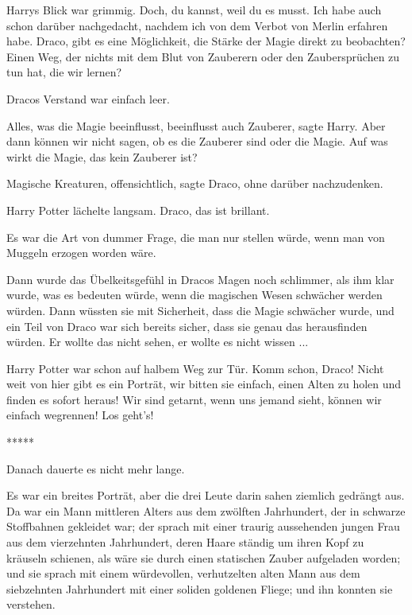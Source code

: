 Harrys Blick war grimmig. \glqq{}Doch, du kannst, weil du es musst. Ich habe
auch schon darüber nachgedacht, nachdem ich von dem Verbot von Merlin erfahren
habe. Draco, gibt es eine Möglichkeit, die Stärke der Magie direkt zu
beobachten? Einen Weg, der nichts mit dem Blut von Zauberern oder den
Zaubersprüchen zu tun hat, die wir lernen?\grqq{}

Dracos Verstand war einfach leer.

\glqq{}Alles, was die Magie beeinflusst, beeinflusst auch Zauberer\grqq{}, sagte
Harry. \glqq{}Aber dann können wir nicht sagen, ob es die Zauberer sind oder die
Magie. Auf was wirkt die Magie, das kein Zauberer ist?\grqq{}

\glqq{}Magische Kreaturen, offensichtlich\grqq{}, sagte Draco, ohne darüber
nachzudenken.

Harry Potter lächelte langsam. \glqq{}Draco, das ist brillant.\grqq{}

Es war die Art von dummer Frage, die man nur stellen würde, wenn man von Muggeln
erzogen worden wäre.

Dann wurde das Übelkeitsgefühl in Dracos Magen noch schlimmer, als ihm klar
wurde, was es bedeuten würde, wenn die magischen Wesen schwächer werden würden.
Dann wüssten sie mit Sicherheit, dass die Magie schwächer wurde, und ein Teil
von Draco war sich bereits sicher, dass sie genau das herausfinden würden. Er
wollte das nicht sehen, er wollte es nicht wissen ...

Harry Potter war schon auf halbem Weg zur Tür. \glqq{}Komm schon, Draco! Nicht
weit von hier gibt es ein Porträt, wir bitten sie einfach, einen Alten zu holen
und finden es sofort heraus! Wir sind getarnt, wenn uns jemand sieht, können wir
einfach wegrennen! Los geht's!\grqq{}

\begin{center}*****\end{center}

Danach dauerte es nicht mehr lange.

Es war ein breites Porträt, aber die drei Leute darin sahen ziemlich gedrängt
aus. Da war ein Mann mittleren Alters aus dem zwölften Jahrhundert, der in
schwarze Stoffbahnen gekleidet war; der sprach mit einer traurig aussehenden
jungen Frau aus dem vierzehnten Jahrhundert, deren Haare ständig um ihren Kopf
zu kräuseln schienen, als wäre sie durch einen statischen Zauber aufgeladen
worden; und sie sprach mit einem würdevollen, verhutzelten alten Mann aus dem
siebzehnten Jahrhundert mit einer soliden goldenen Fliege; und ihn konnten sie
verstehen.

